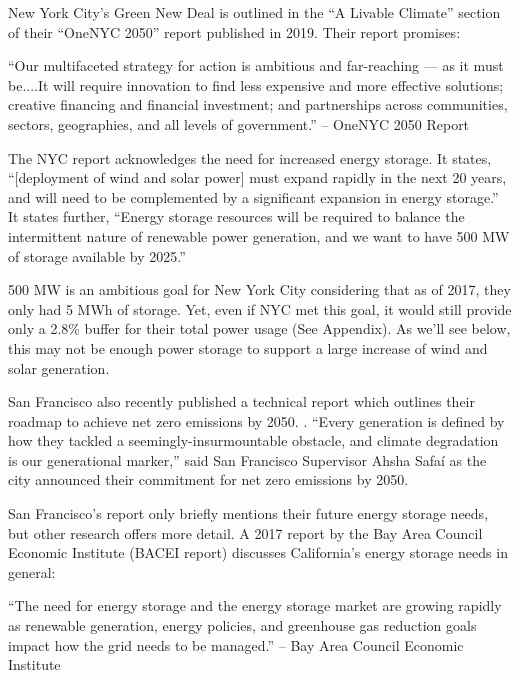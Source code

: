 \documentclass[hidelinks,12pt,a4paper]{article}
\begin{document}
New York City's Green New Deal is outlined in the “A Livable Climate” section of their “OneNYC 2050” report published in 2019. Their report promises:

\begin{displayquote}
“Our multifaceted strategy for action is ambitious and far-reaching — as it must be....It will require innovation to find less expensive and more effective solutions; creative financing and financial investment; and partnerships across communities, sectors, geographies, and all levels of government.” \cite{OneNYC2050FullReport} -- OneNYC 2050 Report
\end{displayquote}

The NYC report acknowledges the need for increased energy storage. It states, “[deployment of wind and solar power] must expand rapidly in the next 20 years, and will need to be complemented by a significant expansion in energy storage.” \cite{OneNYC2050FullReport} It states further, “Energy storage resources will be required to balance the intermittent nature of renewable power generation, and we want to have 500 MW of storage available by 2025.”

500 MW is an ambitious goal for New York City considering that as of 2017, they only had 5 MWh of storage\cite{NYEnergyStorageTargetTheJourneyNotTheDestination}. Yet, even if NYC met this goal, it would still provide only a 2.8\% buffer for their total power usage (See Appendix). As we'll see below, this may not be enough power storage to support a large increase of wind and solar generation.

San Francisco also recently published a technical report which outlines their roadmap to achieve net zero emissions by 2050. \cite{Focus2030APathwaytoNetZeroEmissions}. “Every generation is defined by how they tackled a seemingly-insurmountable obstacle, and climate degradation is our generational marker,” said San Francisco Supervisor Ahsha Safaí as the city announced their commitment for net zero emissions by 2050.\cite{SanFranciscoMayor100PercentRenewableElectricity}

San Francisco's report only briefly mentions their future energy storage needs, but other research offers more detail. A 2017 report by the Bay Area Council Economic Institute (BACEI report) discusses California's energy storage needs in general:

\begin{displayquote}
“The need for energy storage and the energy storage market are growing rapidly as renewable generation, energy policies, and greenhouse gas reduction goals impact how the grid needs to be managed.”\cite{EnergyStorageCaliforniaClimateandEnergyGoals} --  Bay Area Council Economic Institute
\end{displayquote}
\end{document}
